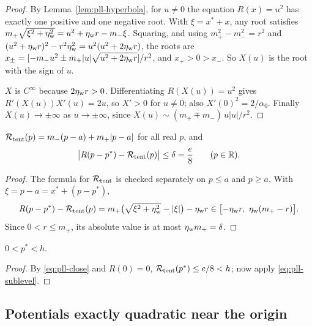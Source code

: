 \begin{proof}
By Lemma~\ref{lem:pll-hyperbola}, for $u\ne0$ the equation $R(x)=u^2$ has exactly one positive and one negative root. With $\xi=x^*+x$, any root satisfies $m_+\sqrt{\xi^2+\eta_{\rm w}^2}=u^2+\eta_{\rm w} r-m_-\xi$. Squaring, and using $m_+^2-m_-^2=r^2$ and $(u^2+\eta_{\rm w} r)^2-r^2\eta_{\rm w}^2=u^2(u^2+2\eta_{\rm w} r)$, the roots are
$x_\pm=[-m_-u^2\pm m_+|u|\sqrt{u^2+2\eta_{\rm w} r}]/r^2$, and $x_+>0>x_-$. So $X(u)$ is the root with the sign of $u$.

$X$ is $C^\infty$ because $2\eta_{\rm w} r>0$. Differentiating $R(X(u))=u^2$ gives $R'(X(u))X'(u)=2u$, so $X'>0$ for $u\ne0$; also $X'(0)^2=2/\alpha_0$. Finally $X(u)\to\pm\infty$ as $u\to\pm\infty$, since $X(u)\sim(m_+\mp m_-)\,u|u|/r^2$.
\end{proof}

\begin{lemma}\label{lem:pll-close}
$\mathcal{R}_{\rm tent}(p)=m_-(p-a)+m_+|p-a|$ for all real $p$, and
\begin{equation}\label{eq:pll-close}
 \bigl|R(p-p^*)-\mathcal{R}_{\rm tent}(p)\bigr|\le\delta=\frac e8\qquad(p\in\mathbb{R}).
\end{equation}
\end{lemma}

\begin{proof}
The formula for $\mathcal{R}_{\rm tent}$ is checked separately on $p\le a$ and $p\ge a$. With $\xi=p-a=x^*+(p-p^*)$,
\[
R(p-p^*)-\mathcal{R}_{\rm tent}(p)=m_+\bigl(\sqrt{\xi^2+\eta_{\rm w}^2}-|\xi|\bigr)-\eta_{\rm w} r\in\bigl[-\eta_{\rm w} r,\ \eta_{\rm w}(m_+-r)\bigr].
\]
Since $0<r\le m_+$, its absolute value is at most $\eta_{\rm w} m_+=\delta$.
\end{proof}

\begin{lemma}\label{lem:pll-pstar}
$0<p^*<h$.
\end{lemma}

\begin{proof}
By \eqref{eq:pll-close} and $R(0)=0$, $\mathcal{R}_{\rm tent}(p^*)\le e/8<h$; now apply \eqref{eq:pll-sublevel}.
\end{proof}

\subsection{Potentials exactly quadratic near the origin}\label{sec:pll-morse}

